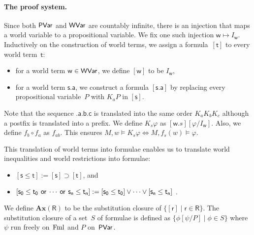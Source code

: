     \paragraph{The proof system.}
    Since both $\mathsf{PVar}$ and $\mathsf{WVar}$ are countably infinite,
    there is an injection that maps a world variable to a propositional
    variable.
    We fix one such injection
    $\mathsf w\mapsto I_{\mathsf w}$.
    Inductively on the construction of world terms,
    we assign a formula~$[\mathsf t]$ to every world term~$\mathsf t$:
    \begin{itemize}
     \item for a world term $\mathsf w\in \mathsf{WVar}$, we define $[\mathsf w]$ to be
	   $I_{\mathsf w}$,
     \item for a world term $\mathsf{s.a}$, we construct
	   a formula $[\mathsf{s.a}]$ by
	   replacing every propositional variable~$P$ with $K_aP$ in $[\mathsf s]$.
    \end{itemize}
    Note that the sequence $\mathsf{.a.b.c}$ is translated into the same
    order $K_a K_b K_c$ although a postfix is translated into a prefix.
    We define $K_s\varphi$ as $[\mathsf w.s][\varphi/I_{\mathsf w}]$.
    Also, we define $f_b\circ f_a$ as $f_{ab}$.  This ensures $M, w\models
    K_s\varphi\Leftrightarrow M,f_s(w)\models\varphi$.

    This translation of world terms into formulae
    enables us to translate world inequalities and world restrictions
    into formulae:
    \begin{itemize}
     \item $[\mathsf s\le \mathsf t] := [\mathsf s]\supset [\mathsf t]$, and
     \item $[\mathsf{s_0}\le \mathsf{t_0}\,\mathbin{\mathsf{or}}\, \cdots\,\mathbin{\mathsf{or}}\, \mathsf{s_n}\le \mathsf{t_n}] := [\mathsf{s_0}\le \mathsf{t_0}]\vee
	   \cdots \vee [\mathsf{s_n}\le \mathsf{t_n}]$ \enspace.
    \end{itemize}

    We define $\mathbf{Ax}(\mathsf R)$ to be the substitution closure of
    $\{[\mathsf r]\mid \mathsf r\in \mathsf R\}$.
    The substitution closure of a set~$S$ of formulae is defined as
    $\{\phi[\psi/P]\mid \phi\in S\}$ where $\psi$ run freely on~$\mathsf{\operatorname{Fml}}$ and $P$ on~$\mathsf{PVar}$.

